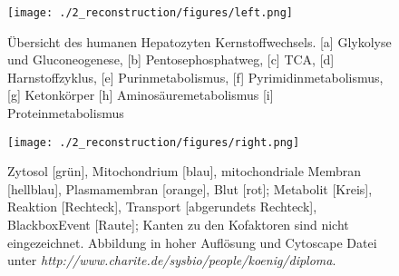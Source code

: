 \begin{figure}[ht]
 \centering
 \texttt{[image: ./2\_reconstruction/figures/left.png]}
 \caption{Übersicht des humanen Hepatozyten Kernstoffwechsels. [a] Glykolyse und Gluconeogenese, [b] Pentosephosphatweg, [c] TCA, [d] Harnstoffzyklus, [e] Purinmetabolismus, [f] Pyrimidinmetabolismus, [g] Ketonkörper [h] Aminosäuremetabolismus [i] Proteinmetabolismus}
 \label{fig: reconstruction1}
\end{figure}

\begin{figure}[ht]
 \centering
 \texttt{[image: ./2\_reconstruction/figures/right.png]}
 \caption{Zytosol [grün], Mitochondrium [blau], mitochondriale Membran [hellblau], Plasmamembran [orange], Blut [rot]; Metabolit [Kreis], Reaktion [Rechteck], Transport [abgerundets Rechteck], BlackboxEvent [Raute]; Kanten zu den Kofaktoren sind nicht eingezeichnet. Abbildung in hoher Auflösung und Cytoscape Datei unter \textit{http://www.charite.de/sysbio/people/koenig/diploma}.}
 \label{fig: reconstruction2}
\end{figure}
























